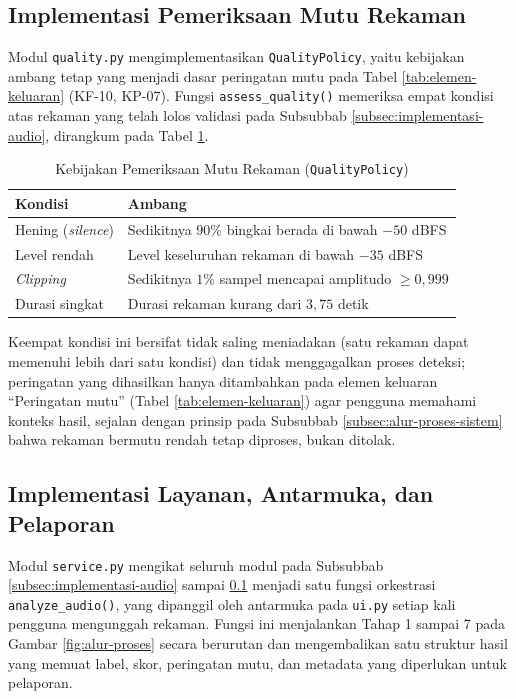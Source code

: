 \subsection{Implementasi Pemeriksaan Mutu Rekaman}
\label{subsec:implementasi-mutu}

Modul \texttt{quality.py} mengimplementasikan \texttt{QualityPolicy}, yaitu
kebijakan ambang tetap yang menjadi dasar peringatan mutu pada Tabel
\ref{tab:elemen-keluaran} (KF-10, KP-07). Fungsi \texttt{assess\_quality()}
memeriksa empat kondisi atas rekaman yang telah lolos validasi pada Subsubbab
\ref{subsec:implementasi-audio}, dirangkum pada Tabel \ref{tab:kebijakan-mutu}.

\begin{table}[htbp]
  \centering
  \caption{Kebijakan Pemeriksaan Mutu Rekaman (\texttt{QualityPolicy})}
  \label{tab:kebijakan-mutu}
  \begin{tabular}{@{}lp{8.6cm}@{}}
    \toprule
    \textbf{Kondisi} & \textbf{Ambang} \\
    \midrule
    Hening (\textit{silence}) & Sedikitnya $90\%$ bingkai berada di bawah $-50$ dBFS \\
    Level rendah & Level keseluruhan rekaman di bawah $-35$ dBFS \\
    \textit{Clipping} & Sedikitnya $1\%$ sampel mencapai amplitudo $\geq 0{,}999$ \\
    Durasi singkat & Durasi rekaman kurang dari $3{,}75$ detik \\
    \bottomrule
  \end{tabular}
\end{table}

Keempat kondisi ini bersifat tidak saling meniadakan (satu rekaman dapat
memenuhi lebih dari satu kondisi) dan tidak menggagalkan proses deteksi;
peringatan yang dihasilkan hanya ditambahkan pada elemen keluaran ``Peringatan
mutu'' (Tabel \ref{tab:elemen-keluaran}) agar pengguna memahami konteks hasil,
sejalan dengan prinsip pada Subsubbab \ref{subsec:alur-proses-sistem} bahwa
rekaman bermutu rendah tetap diproses, bukan ditolak.

\subsection{Implementasi Layanan, Antarmuka, dan Pelaporan}
\label{subsec:implementasi-layanan}

Modul \texttt{service.py} mengikat seluruh modul pada Subsubbab
\ref{subsec:implementasi-audio} sampai \ref{subsec:implementasi-mutu} menjadi
satu fungsi orkestrasi \texttt{analyze\_audio()}, yang dipanggil oleh antarmuka
pada \texttt{ui.py} setiap kali pengguna mengunggah rekaman. Fungsi ini
menjalankan Tahap 1 sampai 7 pada Gambar \ref{fig:alur-proses} secara berurutan
dan mengembalikan satu struktur hasil yang memuat label, skor, peringatan mutu,
dan metadata yang diperlukan untuk pelaporan.

